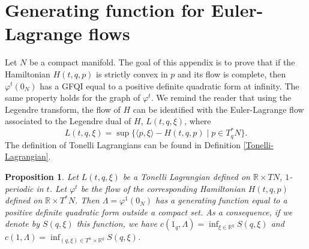\documentclass[JEP,XML,SOM,NoFloatCountersInSection,Unicode,published]{cedram}
\numberwithin{equation}{section}
\newcommand{\GFQI}{\textup{GFQI}\xspace}
\theoremstyle{plain}
\newtheorem{proposition}[theorem]{Proposition}
\theoremstyle{definition}
\theoremstyle{remark}
\begin{document}
\section{Generating function for Euler-Lagrange flows} \label{Appendix-Lag}

Let $N$ be a compact manifold. The goal of this appendix is to prove that if the Hamiltonian $H(t,q,p)$ is strictly convex in $p$ and its flow is complete, then $\varphi^{t}(0_{N})$ has a \GFQI equal to a positive definite quadratic form at infinity.
The same property holds for the graph of $\varphi^{t}$. We remind the reader that using the Legendre transform, the flow of $H$ can be identified with the Euler-Lagrange flow associated to the
Legendre dual of $H$, $L(t,q,\xi)$, where
\[
L(t,q,\xi)= \sup \{ \langle p,\xi \rangle - H(t,q,p) \mid p \in T_{q}^{*}N\}.
\]
The definition of Tonelli Lagrangians can be found in Definition \ref{Tonelli-Lagrangian}.

\begin{proposition} \label{Prop-Appendix-Lag}
Let $L(t,q,\xi)$ be a Tonelli Lagrangian defined on ${\mathbb R} \times TN$, $1$\nobreakdash-pe\-ri\-odic in $t$. Let $\varphi^{t}$ be the flow of the corresponding Hamiltonian $H(t,q,p)$ defined on $ {\mathbb R} \times T^{*}N$. Then $\Lambda=\varphi^{1}(0_{N})$ has a generating function equal to a positive definite quadratic form outside a compact set. As a consequence, if we denote by $S(q,\xi)$ this function, we have $c(1_{q},\Lambda)=\inf_{\xi \in {\mathbb R} ^{q}}S(q,\xi)$ and $c(1,\Lambda)=\inf_{(q,\xi)\in T^{n}\times {\mathbb R}^{q}} S(q,\xi)$.
\end{proposition}
\end{document}
